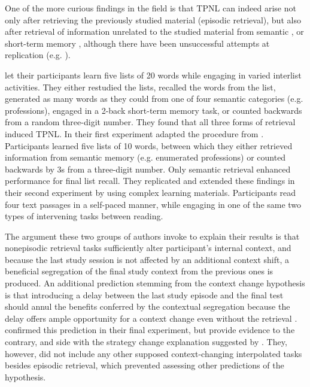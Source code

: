 \documentclass[../main.tex]{subfiles}
\begin{document}
One of the more curious findings in the field is that TPNL can indeed arise 
not only after retrieving the previously studied material (episodic 
retrieval), but also after retrieval of information unrelated to the studied 
material from semantic \citep{divisRetrievalSpeedsContext2014, 
	pastotterRetrievalLearningFacilitates2011}, or short-term memory 
	\citep{pastotterRetrievalLearningFacilitates2011}, although there have 
	been unsuccessful attempts at replication (e.g. 
\citealp{weinsteinNotAllRetrieval2015}). 

\cite{pastotterRetrievalLearningFacilitates2011} let their participants 
learn five lists of 20 words while engaging in varied interlist activities. 
They either restudied the lists, recalled the words from the list, generated 
as many words as they could from one of four semantic categories (e.g. 
professions), engaged in a 2-back short-term memory task, or counted 
backwards from a random three-digit number. They found that all three forms 
of retrieval induced TPNL. In their first experiment 
\cite{divisRetrievalSpeedsContext2014} adapted the procedure from 
\cite{pastotterRetrievalLearningFacilitates2011}. Participants learned five 
lists of 10 words, between which they either retrieved information from 
semantic memory (e.g. enumerated professions) or counted backwards by 3s 
from a three-digit number. Only semantic retrieval enhanced performance for 
final list recall. They replicated and extended these findings in their 
second experiment by using complex learning materials. Participants read 
four text passages in a self-paced manner, while engaging in one of the same 
two types of intervening tasks between reading. 

The argument these two groups of authors invoke to explain their results is 
that nonepisodic retrieval tasks sufficiently alter participant's internal 
context, and because the last study session is not affected by an additional 
context shift, a beneficial segregation of the final study context from the 
previous ones is produced. An additional prediction stemming from the 
context change hypothesis is that introducing a delay between the last study 
episode and the final test should annul the benefits conferred by the 
contextual segregation because the delay offers ample opportunity for a 
context change even without the retrieval 
\citep{chanRetrievalPotentiatesNew2018}. 
\cite{divisRetrievalSpeedsContext2014} confirmed this prediction in their 
final experiment, but \cite{chanTestingPotentiatesNew2018} provide evidence 
to the contrary, and side with the strategy change explanation suggested by 
\cite{wissmanInterimTestEffect2011}. They, however, did not include any 
other supposed context-changing interpolated tasks besides episodic 
retrieval, which prevented assessing other predictions of the hypothesis. 
\end{document}
